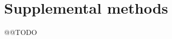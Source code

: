 \documentclass[a4paper,11pt,abstracton,hidelinks]{scrartcl}
\begin{document}
\clearpage


\section{Supplemental methods}

@@TODO


\printbibliography
\end{document}
